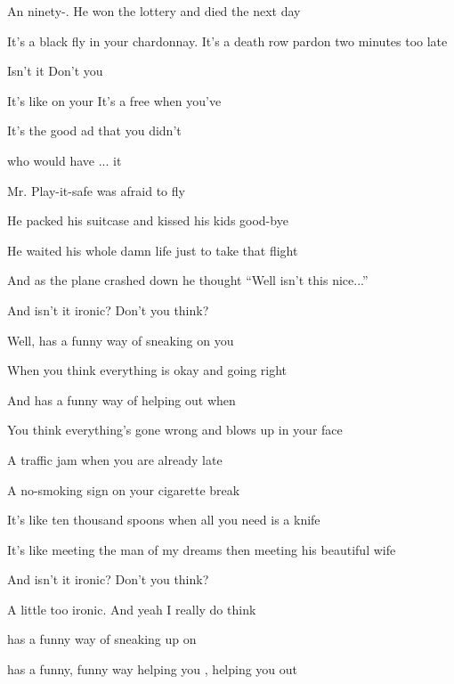 

\zs
An    ninety-.
He won the lottery and died the next day

It's a black fly in your chardonnay.
It's a death row pardon two minutes too late

Isn't it  Don't you  
\ks

\zr
It's like  on your  
It's a free  when you've  

It's the good ad that you  didn't 

 who would have ... it 
\kr

\zs
Mr. Play-it-safe was afraid to fly

He packed his suitcase and kissed his kids good-bye

He waited his whole damn life just to take that flight

And as the plane crashed down he thought ``Well isn't this nice...''

And isn't it ironic? Don't you think?
\ks

\zr  \kr

\zs
Well,  has a funny way of sneaking  on you

When you think everything is okay and  going right

And  has a funny way of helping  out when

You think everything's gone wrong and  blows up in your face
\ks

\zs
A traffic jam when you are already late

A no-smoking sign on your cigarette break

It's like ten thousand spoons when all you need is a knife

It's like meeting the man of my dreams then meeting his beautiful wife

And isn't it ironic? Don't you think?

A little too ironic. And yeah I really do think
\ks

\zr  \kr

\zs
{} has a funny way of sneaking up on 

 has a funny, funny way  helping you , helping you out
\ks

\kp






















